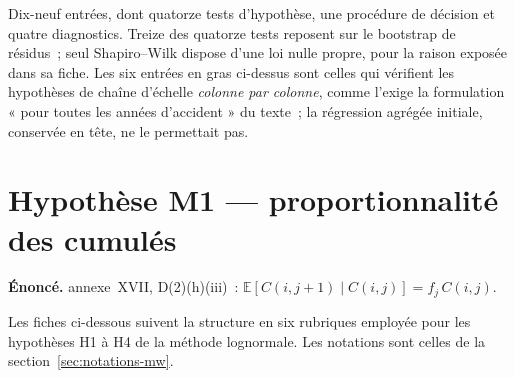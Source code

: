\documentclass[a4paper,11pt]{article}
\begin{document}
\noindent
Dix-neuf entrées, dont quatorze tests d'hypothèse, une procédure de décision et
quatre diagnostics. Treize des quatorze tests reposent sur le bootstrap de
résidus~; seul Shapiro--Wilk dispose d'une loi nulle propre, pour la raison
exposée dans sa fiche. Les six entrées en gras ci-dessus sont celles qui
vérifient les hypothèses de chaîne d'échelle \emph{colonne par colonne}, comme
l'exige la formulation « pour toutes les années d'accident » du texte~; la
régression agrégée initiale, conservée en tête, ne le permettait pas.

\clearpage
\section{Hypothèse M1 --- proportionnalité des cumulés}
\label{sec:mwm1}

\begin{encadre}
\textbf{Énoncé.} annexe~XVII, D(2)(h)(iii)~: $\mathbb{E}[C(i,j+1)\mid C(i,j)] = f_j\,C(i,j)$.
\end{encadre}

Les fiches ci-dessous suivent la structure en six rubriques employée pour les
hypothèses H1 à H4 de la méthode lognormale. Les notations sont celles de la
section~\ref{sec:notations-mw}.
\end{document}
